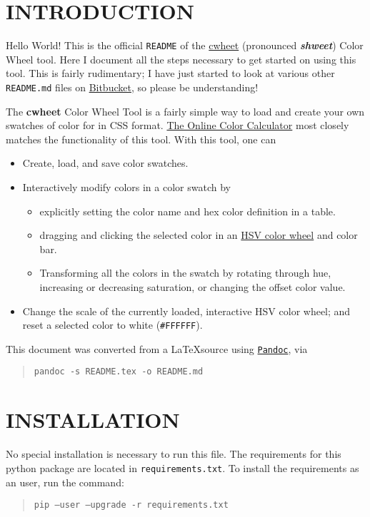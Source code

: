 \documentclass[]{article}
\author{Tanim Islam}
\date{\today}
\begin{document}
\section{INTRODUCTION}\label{introduction}

Hello World! This is the official \texttt{README} of the
\href{https://bitbucket.org/tanim_islam/cwheet}{cwheet} (pronounced
\textit{\textbf{shweet}}) Color Wheel tool. Here I document all the
steps necessary to get started on using this tool. This is fairly
rudimentary; I have just started to look at various other
\texttt{README.md} files on \href{https://bitbucket.org}{Bitbucket},
so please be understanding!

The \textbf{cwheet} Color Wheel Tool is a fairly simple way to load
and create your own swatches of color for in CSS
format. \href{http://www.sessions.edu/color-calculator}{The Online
 Color Calculator} most closely matches the functionality of this
tool. With this tool, one can
\begin{itemize}
  \item Create, load, and save color swatches.
  \item Interactively modify colors in a color swatch by
    \begin{itemize}
      \item explicitly setting the color name and hex color definition
        in a table.
      \item dragging and clicking the selected color in an
        \href{https://en.wikipedia.org/wiki/HSL_and_HSV}{HSV color
          wheel} and color bar.        
        \item Transforming all the colors in the swatch by rotating
          through hue, increasing or decreasing saturation, or
          changing the offset color value.
    \end{itemize}
  \item Change the scale of the currently loaded, interactive HSV
    color wheel; and reset a selected color to white
    (\texttt{\#FFFFFF}). 
\end{itemize}

This document was converted from a \LaTeX source using
\href{http://pandoc.org/index.html}{\texttt{Pandoc}}, via
\blockquote{\texttt{pandoc -s README.tex -o README.md}}.

\section{INSTALLATION}
No special installation is necessary to run this file. The
requirements for this python package are located in
\texttt{requirements.txt}. To install the requirements as an user, run
the command:
\blockquote{\texttt{pip --user --upgrade -r requirements.txt}}
\end{document}
